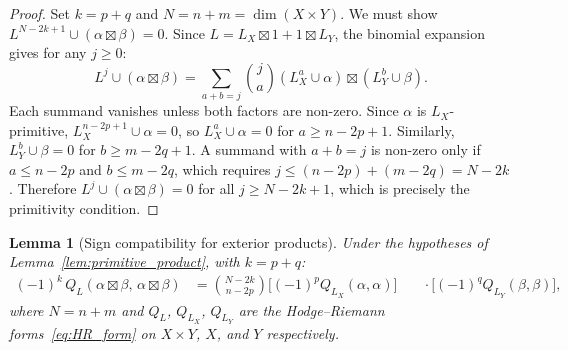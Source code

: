 \documentclass[aps,prd,twocolumn,superscriptaddress,nofootinbib]{revtex4-2}
\newtheorem{lemma}[theorem]{Lemma}
\theoremstyle{definition}
\theoremstyle{remark}
\def\\{ }%
\begin{document}
\begin{proof}
Set $k = p + q$ and $N = n + m = \dim(X \times Y)$. We must show $L^{N-2k+1} \cup (\alpha \boxtimes \beta) = 0$. Since $L = L_X \boxtimes 1 + 1 \boxtimes L_Y$, the binomial expansion gives for any $j \geq 0$:
\[
L^j \cup (\alpha \boxtimes \beta) = \sum_{a+b=j} \binom{j}{a} (L_X^a \cup \alpha) \boxtimes (L_Y^b \cup \beta).
\]
Each summand vanishes unless both factors are non-zero. Since $\alpha$ is $L_X$-primitive, $L_X^{n-2p+1} \cup \alpha = 0$, so $L_X^a \cup \alpha = 0$ for $a \geq n - 2p + 1$. Similarly, $L_Y^b \cup \beta = 0$ for $b \geq m - 2q + 1$. A summand with $a + b = j$ is non-zero only if $a \leq n - 2p$ and $b \leq m - 2q$, which requires $j \leq (n - 2p) + (m - 2q) = N - 2k$. Therefore $L^j \cup (\alpha \boxtimes \beta) = 0$ for all $j \geq N - 2k + 1$, which is precisely the primitivity condition.
\end{proof}

\begin{lemma}[Sign compatibility for exterior products]
\label{lem:sign_product}
Under the hypotheses of Lemma~\ref{lem:primitive_product}, with $k = p + q$:
\begin{equation}
\begin{aligned}
(-1)^k\, Q_L(\alpha \boxtimes \beta,\, \alpha \boxtimes \beta)
&= \binom{N-2k}{n-2p}
   \bigl[(-1)^p Q_{L_X}(\alpha, \alpha)\bigr] \\
&\quad\cdot \bigl[(-1)^q Q_{L_Y}(\beta, \beta)\bigr],
\end{aligned}
\label{eq:sign_kunneth}
\end{equation}
where $N = n + m$ and $Q_L$, $Q_{L_X}$, $Q_{L_Y}$ are the Hodge--Riemann forms~\eqref{eq:HR_form} on $X \times Y$, $X$, and $Y$ respectively.
\end{lemma}
\end{document}
